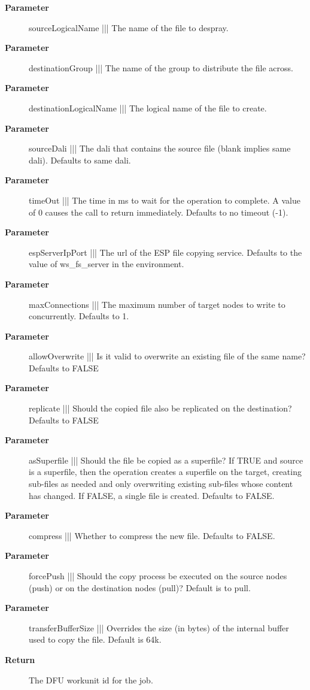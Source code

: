 \par
\begin{description}
\item [\textbf{Parameter}] sourceLogicalName ||| The name of the file to despray.
\item [\textbf{Parameter}] destinationGroup ||| The name of the group to distribute the file across.
\item [\textbf{Parameter}] destinationLogicalName ||| The logical name of the file to create.
\item [\textbf{Parameter}] sourceDali ||| The dali that contains the source file (blank implies same dali). Defaults to same dali.
\item [\textbf{Parameter}] timeOut ||| The time in ms to wait for the operation to complete. A value of 0 causes the call to return immediately. Defaults to no timeout (-1).
\item [\textbf{Parameter}] espServerIpPort ||| The url of the ESP file copying service. Defaults to the value of ws\_fs\_server in the environment.
\item [\textbf{Parameter}] maxConnections ||| The maximum number of target nodes to write to concurrently. Defaults to 1.
\item [\textbf{Parameter}] allowOverwrite ||| Is it valid to overwrite an existing file of the same name? Defaults to FALSE
\item [\textbf{Parameter}] replicate ||| Should the copied file also be replicated on the destination? Defaults to FALSE
\item [\textbf{Parameter}] asSuperfile ||| Should the file be copied as a superfile? If TRUE and source is a superfile, then the operation creates a superfile on the target, creating sub-files as needed and only overwriting existing sub-files whose content has changed. If FALSE, a single file is created. Defaults to FALSE.
\item [\textbf{Parameter}] compress ||| Whether to compress the new file. Defaults to FALSE.
\item [\textbf{Parameter}] forcePush ||| Should the copy process be executed on the source nodes (push) or on the destination nodes (pull)? Default is to pull.
\item [\textbf{Parameter}] transferBufferSize ||| Overrides the size (in bytes) of the internal buffer used to copy the file. Default is 64k.
\item [\textbf{Return}] The DFU workunit id for the job.
\end{description}

